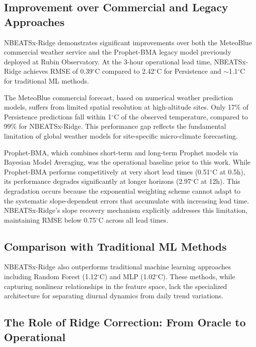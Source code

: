 \documentclass[twocolumn]{aastex631}
\begin{document}
\subsection{Improvement over Commercial and Legacy Approaches}

NBEATSx-Ridge demonstrates significant improvements over both the MeteoBlue commercial weather service and the Prophet-BMA legacy model previously deployed at Rubin Observatory. At the 3-hour operational lead time, NBEATSx-Ridge achieves RMSE of 0.39$^\circ$C compared to 2.42$^\circ$C for Persistence and $\sim$1.1$^\circ$C for traditional ML methods.

The MeteoBlue commercial forecast, based on numerical weather prediction models, suffers from limited spatial resolution at high-altitude sites. Only 17\% of Persistence predictions fall within 1$^\circ$C of the observed temperature, compared to 99\% for NBEATSx-Ridge. This performance gap reflects the fundamental limitation of global weather models for site-specific micro-climate forecasting.

Prophet-BMA, which combines short-term and long-term Prophet models via Bayesian Model Averaging, was the operational baseline prior to this work. While Prophet-BMA performs competitively at very short lead times (0.51$^\circ$C at 0.5h), its performance degrades significantly at longer horizons (2.97$^\circ$C at 12h). This degradation occurs because the exponential weighting scheme cannot adapt to the systematic slope-dependent errors that accumulate with increasing lead time. NBEATSx-Ridge's slope recovery mechanism explicitly addresses this limitation, maintaining RMSE below 0.75$^\circ$C across all lead times.

\subsection{Comparison with Traditional ML Methods}

NBEATSx-Ridge also outperforms traditional machine learning approaches including Random Forest (1.12$^\circ$C) and MLP (1.02$^\circ$C). These methods, while capturing nonlinear relationships in the feature space, lack the specialized architecture for separating diurnal dynamics from daily trend variations.

\subsection{The Role of Ridge Correction: From Oracle to Operational}
\end{document}
